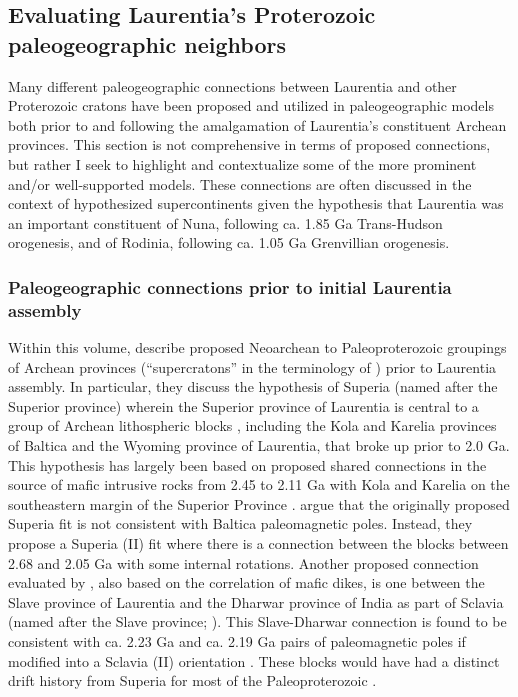 \documentclass[twocolumn, switch]{article} %
\begin{document}
\subsection{Evaluating Laurentia's Proterozoic paleogeographic neighbors}

Many different paleogeographic connections between Laurentia and other Proterozoic cratons have been proposed and utilized in paleogeographic models both prior to and following the amalgamation of Laurentia's constituent Archean provinces. This section is not comprehensive in terms of proposed connections, but rather I seek to highlight and contextualize some of the more prominent and/or well-supported models. These connections are often discussed in the context of hypothesized supercontinents given the hypothesis that Laurentia was an important constituent of Nuna, following ca. 1.85 Ga Trans-Hudson orogenesis, and of Rodinia, following ca. 1.05 Ga Grenvillian orogenesis. 

\subsubsection{Paleogeographic connections prior to initial Laurentia assembly}

Within this volume, \cite{Salminen2021a} describe proposed Neoarchean to Paleoproterozoic groupings of Archean provinces (``supercratons'' in the terminology of \citealp{Bleeker2003a}) prior to Laurentia assembly. In particular, they discuss the hypothesis of Superia (named after the Superior province) wherein the Superior province of Laurentia is central to a group of Archean lithospheric blocks \citep{Bleeker2006a}, including the Kola and Karelia provinces of Baltica and the Wyoming province of Laurentia, that broke up prior to 2.0 Ga. This hypothesis has largely been based on proposed shared connections in the source of mafic intrusive rocks from 2.45 to 2.11 Ga with Kola and Karelia on the southeastern margin of the Superior Province \citep{Davey2020a}. \cite{Salminen2021a}  argue that the originally proposed Superia fit is not consistent with Baltica paleomagnetic poles. Instead, they propose a Superia (II) fit where there is a connection between the blocks between 2.68 and 2.05 Ga with some internal rotations. Another proposed connection evaluated by \cite{Salminen2021a}, also based on the correlation of mafic dikes, is one between the Slave province of Laurentia and the Dharwar province of India \citep{French2010a} as part of Sclavia (named after the Slave province; \citealp{Bleeker2003a}). This Slave-Dharwar connection is found to be consistent with ca. 2.23 Ga and ca. 2.19 Ga pairs of paleomagnetic poles if modified into a Sclavia (II) orientation \citep{Salminen2021a}. These blocks would have had a distinct drift history from Superia for most of the Paleoproterozoic \citep{Salminen2021a}.
\end{document}
